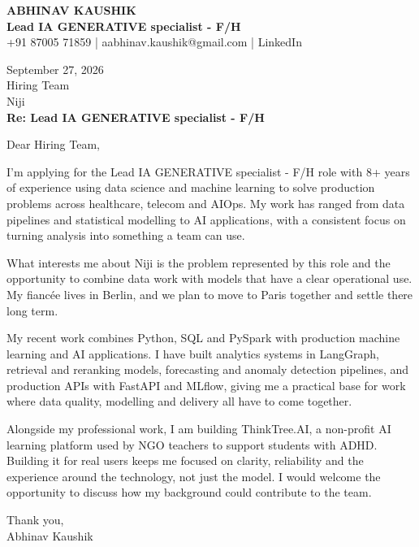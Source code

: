 \documentclass[10pt,a4paper]{article}
\begin{document}
\begin{center}
{\Large\bfseries ABHINAV KAUSHIK}\\[2pt]
{\bfseries Lead IA GENERATIVE specialist - F/H}\\[2pt]
+91 87005 71859 \quad | \quad aabhinav.kaushik@gmail.com \quad | \quad LinkedIn
\end{center}
\vspace{8pt}
September 27, 2026\\[6pt]
Hiring Team\\
Niji\\[4pt]
\textbf{Re: Lead IA GENERATIVE specialist - F/H}

Dear Hiring Team,

I’m applying for the Lead IA GENERATIVE specialist - F/H role with 8+ years of experience using data science and machine learning to solve production problems across healthcare, telecom and AIOps. My work has ranged from data pipelines and statistical modelling to AI applications, with a consistent focus on turning analysis into something a team can use.

What interests me about Niji is the problem represented by this role and the opportunity to combine data work with models that have a clear operational use. My fiancée lives in Berlin, and we plan to move to Paris together and settle there long term.

My recent work combines Python, SQL and PySpark with production machine learning and AI applications. I have built analytics systems in LangGraph, retrieval and reranking models, forecasting and anomaly detection pipelines, and production APIs with FastAPI and MLflow, giving me a practical base for work where data quality, modelling and delivery all have to come together.

Alongside my professional work, I am building ThinkTree.AI, a non-profit AI learning platform used by NGO teachers to support students with ADHD. Building it for real users keeps me focused on clarity, reliability and the experience around the technology, not just the model. I would welcome the opportunity to discuss how my background could contribute to the team.

Thank you,\\
Abhinav Kaushik
\end{document}

